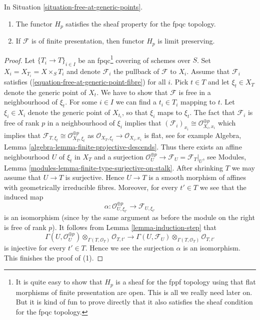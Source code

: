 \begin{lemma}
\label{lemma-free-at-generic-points}
In Situation \ref{situation-free-at-generic-points}.
\begin{enumerate}
\item The functor $H_p$ satisfies the sheaf property for the fpqc topology.
\item If $\mathcal{F}$ is of finite presentation, then functor $H_p$ is
limit preserving.
\end{enumerate}
\end{lemma}

\begin{proof}
Let $\{T_i \to T\}_{i \in I}$ be an fpqc\footnote{It is quite easy to
show that $H_p$
is a sheaf for the fppf topology using that flat morphisms of finite
presentation are open. This is all we really need later on. But it is kind
of fun to prove directly that it also satisfies the sheaf condition
for the fpqc topology.} covering of schemes over $S$.
Set $X_i = X_{T_i} = X \times_S T_i$ and denote $\mathcal{F}_i$ the
pullback of $\mathcal{F}$ to $X_i$. Assume that $\mathcal{F}_i$ satisfies
(\ref{equation-free-at-generic-point-fibre}) for all $i$.
Pick $t \in T$ and let $\xi_t \in X_T$ denote the generic point of $X_t$.
We have to show that $\mathcal{F}$ is free in a neighbourhood of $\xi_t$.
For some $i \in I$ we can find a $t_i \in T_i$ mapping to $t$.
Let $\xi_i \in X_i$ denote the generic point of $X_{t_i}$, so that
$\xi_i$ maps to $\xi_t$. The fact that $\mathcal{F}_i$ is free of rank
$p$ in a neighbourhood of $\xi_i$ implies that
$(\mathcal{F}_i)_{x_i} \cong \mathcal{O}_{X_i, x_i}^{\oplus p}$
which implies that
$\mathcal{F}_{T, \xi_t} \cong \mathcal{O}_{X_T, \xi_t}^{\oplus p}$
as $\mathcal{O}_{X_T, \xi_t} \to \mathcal{O}_{X_i, x_i}$ is flat, see
for example
Algebra, Lemma \ref{algebra-lemma-finite-projective-descends}.
Thus there exists an affine neighbourhood $U$ of $\xi_t$ in $X_T$
and a surjection
$\mathcal{O}_U^{\oplus p} \to \mathcal{F}_U = \mathcal{F}_T|_U$, see
Modules, Lemma \ref{modules-lemma-finite-type-surjective-on-stalk}.
After shrinking $T$ we may assume that $U \to T$ is surjective. Hence
$U \to T$ is a smooth morphism of affines with geometrically irreducible
fibres. Moreover, for every $t' \in T$ we see that the induced map
$$
\alpha :
\mathcal{O}_{U, \xi_{t'}}^{\oplus p}
\longrightarrow
\mathcal{F}_{U, \xi_{t'}}
$$
is an isomorphism (since by the same argument as before the module on the right
is free of rank $p$). It follows from
Lemma \ref{lemma-induction-step}
that
$$
\Gamma(U, \mathcal{O}_U^{\oplus p})
\otimes_{\Gamma(T, \mathcal{O}_T)} \mathcal{O}_{T, t'}
\longrightarrow
\Gamma(U, \mathcal{F}_U)
\otimes_{\Gamma(T, \mathcal{O}_T)} \mathcal{O}_{T, t'}
$$
is injective for every $t' \in T$. Hence we see the surjection $\alpha$ is an
isomorphism. This finishes the proof of (1).


\end{proof}
